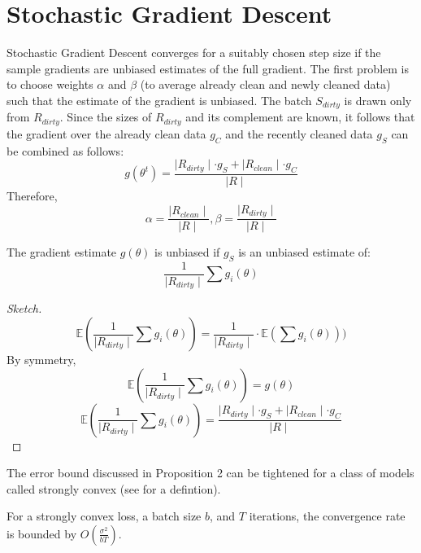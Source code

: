 \section{Stochastic Gradient Descent}\label{appsgd}

Stochastic Gradient Descent converges for a suitably chosen step size if the sample gradients are unbiased estimates of the full gradient. 
The first problem is to choose weights $\alpha$ and $\beta$ (to average already clean and newly cleaned data) such that the estimate of the gradient is unbiased. 
The batch $S_{dirty}$ is drawn only from $R_{dirty}$.
Since the sizes of $R_{dirty}$ and its complement are known, it follows that the gradient over the already clean data $g_C$ and the recently cleaned data $g_S$ can be combined as follows:
\[
g(\theta^{t}) = \frac{\mid R_{dirty} \mid \cdot g_S + \mid R_{clean} \mid \cdot g_C  }{\mid R \mid}
\]
Therefore,
\[
\alpha = \frac{\mid R_{clean} \mid}{\mid R \mid}, \beta = \frac{\mid R_{dirty} \mid}{\mid R \mid}
\]

\begin{lemma}
The gradient estimate $g(\theta)$ is unbiased if $g_S$ is an unbiased estimate of:
\[
\frac{1}{\mid R_{dirty} \mid} \sum g_i(\theta)
\]
\end{lemma}
\begin{proof}[Sketch]
\[
\mathbb{E}(\frac{1}{\mid R_{dirty} \mid} \sum g_i(\theta)) = \frac{1}{\mid R_{dirty} \mid} \cdot \mathbb{E}(\sum g_i(\theta)))
\]
By symmetry, 
\[
\mathbb{E}(\frac{1}{\mid R_{dirty} \mid} \sum g_i(\theta)) = g(\theta)
\]
\[
\mathbb{E}(\frac{1}{\mid R_{dirty} \mid} \sum g_i(\theta)) = \frac{\mid R_{dirty} \mid \cdot g_S + \mid R_{clean} \mid \cdot g_C  }{\mid R \mid}
\]
\end{proof}

The error bound discussed in Proposition 2 can be tightened for a class of models called strongly convex (see \cite{bertsekas2011incremental} for a defintion). 

\begin{proposition}
For a strongly convex loss, a batch size $b$, and $T$ iterations, the convergence rate is bounded by $O(\frac{\sigma^2}{bT})$. 
\end{proposition}

